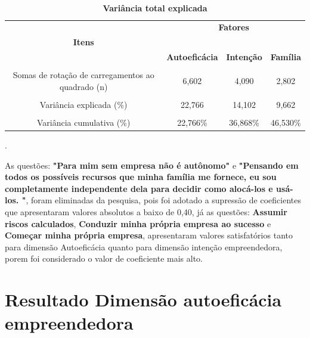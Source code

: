 \begin{table}[!htb]
 \label{tabela_4}
 \centering
\caption{\textbf{Variância total explicada}}
 \\ \hline\hline
\begin{tabular}{c c c c }
\multicolumn{1}{p{6cm}}{} & \multicolumn{3}{c}{\textbf{Fatores}}\\ 
 \multicolumn{1}{c}{\textbf{Itens}} & \multicolumn{3}{c}{\hrulefill}\\ 

 \multicolumn{1}{c}{} 
 &\multicolumn{1}{c}{\textbf{Autoeficácia}} & \multicolumn{1}{c}{\textbf{Intenção}} &\multicolumn{1}{c}{\textbf{Família}}  
\\\\ \hline 

 Somas de rotação de carregamentos ao quadrado (n)
 & 6,602 & 4,090 & 2,802 \\\\
 Variância explicada (\%)
 & 22,766 & 14,102 & 9,662\\\\
 Variância cumulativa (\%)
 & 22,766\% & 36,868\% & 46,530\% \\\hline \hline 
 
\end{tabular}
.
\end{table}



As questões: \textbf{"Para mim sem empresa não é autônomo"} e \textbf{"Pensando em todos os possíveis recursos que minha família me fornece, eu sou completamente independente dela para decidir como alocá-los e usá-los.			
"}, foram eliminadas da pesquisa, pois foi adotado a supressão de coeficientes que apresentaram valores absolutos a baixo de 0,40, já as questões: \textbf{Assumir riscos calculados}, \textbf{Conduzir minha própria empresa ao sucesso} e \textbf{Começar minha própria empresa}, apresentaram valores satisfatórios tanto para dimensão Autoeficácia quanto para dimensão intenção empreendedora, porem foi considerado o valor de coeficiente mais alto.



\section{Resultado Dimensão autoeficácia empreendedora}


